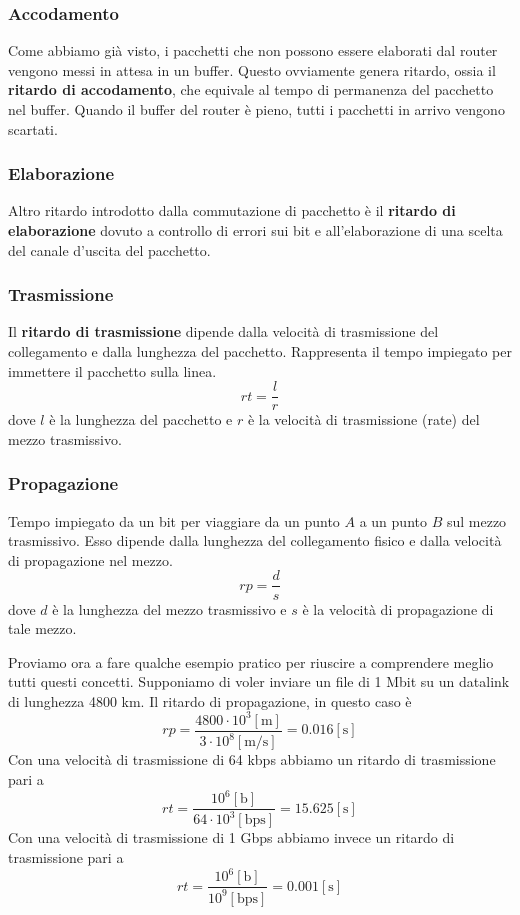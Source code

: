 \subsubsection{Accodamento}
Come abbiamo già visto, i pacchetti che non possono essere elaborati dal router vengono messi in
attesa in un buffer. Questo ovviamente genera ritardo, ossia il \textbf{ritardo di accodamento},
che equivale al tempo di permanenza del pacchetto nel buffer. Quando il buffer del router è pieno,
tutti i pacchetti in arrivo vengono scartati.

\subsubsection{Elaborazione}
Altro ritardo introdotto dalla commutazione di pacchetto è il \textbf{ritardo di elaborazione}
dovuto a controllo di errori sui bit e all'elaborazione di una scelta del canale d'uscita del
pacchetto.

\subsubsection{Trasmissione}
Il \textbf{ritardo di trasmissione} dipende dalla velocità di trasmissione del collegamento e dalla
lunghezza del pacchetto. Rappresenta il tempo impiegato per immettere il pacchetto sulla linea.
\[ rt = \frac{l}{r} \]
dove $l$ è la lunghezza del pacchetto e $r$ è la velocità di trasmissione (rate) del mezzo
trasmissivo.

\subsubsection{Propagazione}
Tempo impiegato da un bit per viaggiare da un punto $A$ a un punto $B$ sul mezzo trasmissivo. Esso
dipende dalla lunghezza del collegamento fisico e dalla velocità di propagazione nel mezzo.
\[ rp = \frac{d}{s} \]
dove $d$ è la lunghezza del mezzo trasmissivo e $s$ è la velocità di propagazione di tale mezzo.

Proviamo ora a fare qualche esempio pratico per riuscire a comprendere meglio tutti questi
concetti. Supponiamo di voler inviare un file di 1 Mbit su un datalink di lunghezza 4800 km. Il 
ritardo di propagazione, in questo caso è 
\[ rp = \frac{4800 \cdot 10^3 [\text{m}]}{3 \cdot 10^8 [\text{m/s}]} = 0.016 [\text{s}] \]
Con una velocità di trasmissione di 64 kbps abbiamo un ritardo di trasmissione pari a
\[ rt = \frac{10^6 [\text{b}]}{64 \cdot 10^3 [\text{bps}]} = 15.625 [\text{s}] \]
Con una velocità di trasmissione di 1 Gbps abbiamo invece un ritardo di trasmissione pari a
\[ rt = \frac{10^6 [\text{b}]}{10^9 [\text{bps}]} = 0.001 [\text{s}] \]

